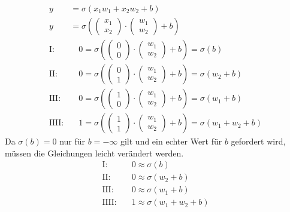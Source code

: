 \begin{align}
    y&=\sigma(x_1w_1+x_2w_2+b) \\
    y&=\sigma\left(\begin{pmatrix}
        x_1 \\
        x_2
    \end{pmatrix}\cdot
    \begin{pmatrix}
        w_1 \\
        w_2
    \end{pmatrix}+b\right) \\
    \text{I:}&\quad 0=\sigma\left(\begin{pmatrix}
        0 \\
        0
    \end{pmatrix}\cdot
    \begin{pmatrix}
        w_1 \\
        w_2
    \end{pmatrix}+b\right)=\sigma(b) \\
    \text{II:}&\quad 0=\sigma\left(\begin{pmatrix}
        0 \\
        1
    \end{pmatrix}\cdot
    \begin{pmatrix}
        w_1 \\
        w_2
    \end{pmatrix}+b\right)=\sigma(w_2+b) \\
    \text{III:}&\quad 0=\sigma\left(\begin{pmatrix}
        1 \\
        0
    \end{pmatrix}\cdot
    \begin{pmatrix}
        w_1 \\
        w_2
    \end{pmatrix}+b\right)=\sigma(w_1+b) \\
    \text{IIII:}&\quad 1=\sigma\left(\begin{pmatrix}
        1 \\
        1
    \end{pmatrix}\cdot
    \begin{pmatrix}
        w_1 \\
        w_2
    \end{pmatrix}+b\right)=\sigma(w_1+w_2+b)
\end{align}
Da $\sigma(b)=0$ nur für $b=-\infty$ gilt und ein echter Wert für $b$ gefordert wird, müssen die Gleichungen leicht verändert werden.
\begin{align}
    \text{I:}&\quad 0\approx\sigma(b) \\
    \text{II:}&\quad 0\approx\sigma(w_2+b) \\
    \text{III:}&\quad 0\approx\sigma(w_1+b) \\
    \text{IIII:}&\quad 1\approx\sigma(w_1+w_2+b)
\end{align}
